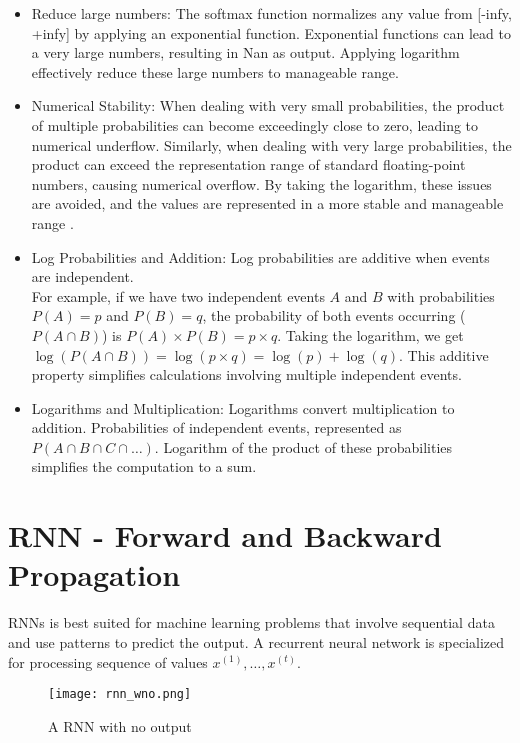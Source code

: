 \begin{itemize}
    \item Reduce large numbers:  The softmax function normalizes any value from [-infy, +infy] by applying an exponential function. Exponential functions can lead to a very large numbers, resulting in  Nan as output. Applying logarithm effectively reduce these large numbers to manageable range.
    \item Numerical Stability: When dealing with very small probabilities, the product of multiple probabilities can become exceedingly close to zero, leading to numerical underflow. Similarly, when dealing with very large probabilities, the product can exceed the representation range of standard floating-point numbers, causing numerical overflow. By taking the logarithm, these issues are avoided, and the values are represented in a more stable and manageable range \parencite[Page 79]{Goodfellow-et-al-2016}.
    
    \item Log Probabilities and Addition: Log probabilities are additive when events are independent.\\ For example, if we have two independent events \(A\) and \(B\) with probabilities \(P(A) = p\) and \(P(B) = q\), the probability of both events occurring (\(P(A \cap B)\)) is \(P(A) \times P(B) = p \times q\). Taking the logarithm, we get \(\log(P(A \cap B)) = \log(p \times q) = \log(p) + \log(q)\). This additive property simplifies calculations involving multiple independent events.

    \item Logarithms and Multiplication: Logarithms convert multiplication to addition. Probabilities of independent events,  represented as \(P(A \cap B \cap C \cap \ldots)\). Logarithm of the product of these probabilities simplifies the computation to a sum. 
\end{itemize}

\section{ \acs*{RNN} - Forward and Backward Propagation}

\acfp{RNN} \parencite{Rumelhart.1986} is best suited for machine learning problems that involve sequential data and use patterns to predict the output. A recurrent neural network is specialized for processing sequence of values $ x^{(1)},\ldots,x^{(t)}$.

\begin{figure}[H]
    \centering    
    \texttt{[image: rnn\_wno.png]}
    \caption{A \acl*{RNN} with no output \parencite[Page 370]{Goodfellow-et-al-2016}}
    \label{fig:RNN without output}
\end{figure}


